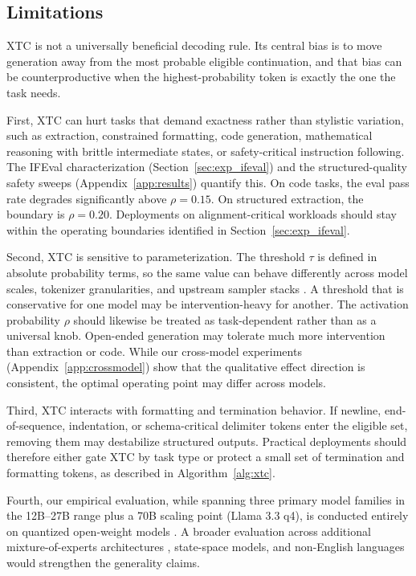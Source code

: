\documentclass{article}
\newcommand{\xtc}{\textsc{XTC}}
\begin{document}
\subsection{Limitations}
\label{sec:limitations}

\xtc{} is not a universally beneficial decoding rule.
Its central bias is to move generation away from the most probable eligible continuation, and that bias can be counterproductive when the highest-probability token is exactly the one the task needs.

First, \xtc{} can hurt tasks that demand exactness rather than stylistic variation, such as extraction, constrained formatting, code generation, mathematical reasoning with brittle intermediate states, or safety-critical instruction following.
The IFEval characterization (Section~\ref{sec:exp_ifeval}) and the structured-quality safety sweeps (Appendix~\ref{app:results}) quantify this.
On code tasks, the eval pass rate degrades significantly above $\rho = 0.15$.
On structured extraction, the boundary is $\rho = 0.20$.
Deployments on alignment-critical workloads should stay within the operating boundaries identified in Section~\ref{sec:exp_ifeval}.

Second, \xtc{} is sensitive to parameterization.
The threshold $\tau$ is defined in absolute probability terms, so the same value can behave differently across model scales, tokenizer granularities, and upstream sampler stacks \citep{wiher2022decoding}.
A threshold that is conservative for one model may be intervention-heavy for another.
The activation probability $\rho$ should likewise be treated as task-dependent rather than as a universal knob.
Open-ended generation may tolerate much more intervention than extraction or code.
While our cross-model experiments (Appendix~\ref{app:crossmodel}) show that the qualitative effect direction is consistent, the optimal operating point may differ across models.

Third, \xtc{} interacts with formatting and termination behavior.
If newline, end-of-sequence, indentation, or schema-critical delimiter tokens enter the eligible set, removing them may destabilize structured outputs.
Practical deployments should therefore either gate \xtc{} by task type or protect a small set of termination and formatting tokens, as described in Algorithm~\ref{alg:xtc}.

Fourth, our empirical evaluation, while spanning three primary model families in the 12B--27B range plus a 70B scaling point (Llama 3.3 q4), is conducted entirely on quantized open-weight models \citep{dettmers2022gptq, lin2024awq}.
A broader evaluation across additional mixture-of-experts architectures \citep{minaee2024large, brown2020language, touvron2023llama2}, state-space models, and non-English languages would strengthen the generality claims.
\end{document}
